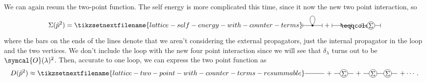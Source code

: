 \documentclass[fleqn]{NotesClass}
\newcommand{\order}{\symcal{O}}
\begin{document}
    We can again resum the two-point function.
    The self energy is more complicated this time, since it now the new two point interaction, so
    \begin{equation}
        \Sigma(\hat{p}^2) = 
        \tikzsetnextfilename{lattice-self-energy-with-counter-terms}
        \begin{tikzpicture}[baseline=(plus.base)]
            \draw (0, 0) -- (1, 0);
            \draw (1.5, 0) -- (2.5, 0);
            \draw (0, -0.1) -- ++ (0, 0.2);
            \draw (1, -0.1) -- ++ (0, 0.2);
            \draw (1.5, -0.1) -- ++ (0, 0.2);
            \draw (2.5, -0.1) -- ++ (0, 0.2);
            \draw (3, -0.1) -- ++ (0, 0.2);
            \draw (4, -0.1) -- ++ (0, 0.2);
            \node (plus) at (1.25, 0) {\(+\)};
            \fill (0.5, 0) circle [radius=0.05];
            \draw (0.5, 0) to[out=45, in=0] (0.5, 0.5);
            \draw (0.5, 0) to[out=135, in=180] (0.5, 0.5);
            \draw[fill=white] (1.95, -0.05) rectangle (2.05, 0.05);
            \node at (2.75, -0.025) {\(\eqqcolon\)};
            \draw (3, 0) -- (4, 0);
            \node[draw, fill=white, circle, inner sep=0.5pt] at (3.5, 0) {\(\Sigma\)};
        \end{tikzpicture}
    \end{equation}
    where the bars on the ends of the lines denote that we aren't considering the external propagators, just the internal propagator in the loop and the two vertices.
    We don't include the loop with the new four point interaction since we will see that \(\delta_\lambda\) turns out to be \(\order(\lambda)^2\).
    Then, accurate to one loop, we can express the two point function as
    \begin{equation}
        D(\hat{p}^2) \approx 
        \tikzsetnextfilename{lattice-two-point-with-counter-terms-resummable}
        \begin{tikzpicture}[baseline=(plus.base)]
            \draw (0, 0) -- (1, 0);
            \draw (1.5, 0) -- (2.5, 0);
            \node (plus) at (1.25, 0) {\(+\)};
            \node at (2.75, 0) {\(+\)};
            \node[draw, fill=white, circle, inner sep=0.5pt] at (2, 0) {\(\Sigma\)};
            \draw (3, 0) -- (4.75, 0);
            \node[draw, fill=white, circle, inner sep=0.5pt] at (3.5, 0) {\(\Sigma\)};
            \node[draw, fill=white, circle, inner sep=0.5pt] at (4.25, 0) {\(\Sigma\)};
            \node at (5.25, 0) {\(+ \dotsb\)};
        \end{tikzpicture}
        .
    \end{equation}
\end{document}
